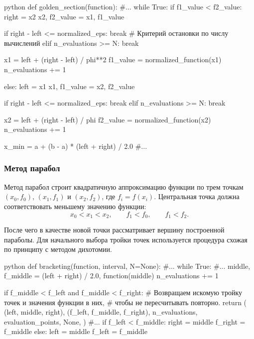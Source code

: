 \begin{mintedbox}{python}
    def golden_section(function):
        #...
        while True:
            if f1_value < f2_value:
                right = x2
                x2, f2_value = x1, f1_value

                if right - left <= normalized_eps:
                    break
                # Критерий остановки по числу вычислений
                elif n_evaluations >= N:
                    break

                x1 = left + (right - left) / phi**2
                f1_value = normalized_function(x1)
                n_evaluations += 1

            else:
                left = x1
                x1, f1_value = x2, f2_value

                if right - left <= normalized_eps:
                    break
                elif n_evaluations >= N:
                    break

                x2 = left + (right - left) / phi
                f2_value = normalized_function(x2)
                n_evaluations += 1

        x_min = a + (b - a) * (left + right) / 2.0
        #...
\end{mintedbox}

\newpage

\subsubsection{Метод парабол}

Метод парабол строит квадратичную аппроксимацию функции по трем точкам
\((x_0, f_0)\), \((x_1, f_1)\) и \((x_2, f_2)\), где
\(f_i = f(x_i)\). Центральная точка должна соответствовать меньшему
значению функции:
\[
x_0 < x_1 < x_2, \qquad f_1 < f_0, \qquad f_1 < f_2.
\]

После чего в качестве новой точки
рассматривает вершину построенной параболы. Для начального выбора тройки точек
используется процедура схожая по принципу с методом дихотомии.

\begin{mintedbox}{python}
    def bracketing(function, interval, N=None):
        #...
        while True:
            #...
            middle, f_middle = (left + right) / 2.0, function(middle)
            n_evaluations += 1

            if f_middle < f_left and f_middle < f_right:
                # Возвращаем искомую тройку точек и значения функции в них,
                # чтобы не пересчитывать повторно.
                return (
                    (left, middle, right),
                    (f_left, f_middle, f_right),
                    n_evaluations,
                    evaluation_points,
                    None,
                )
            #...
            if f_left < f_middle:
                right = middle
                f_right = f_middle
            else:
                left = middle
                f_left = f_middle
\end{mintedbox}

